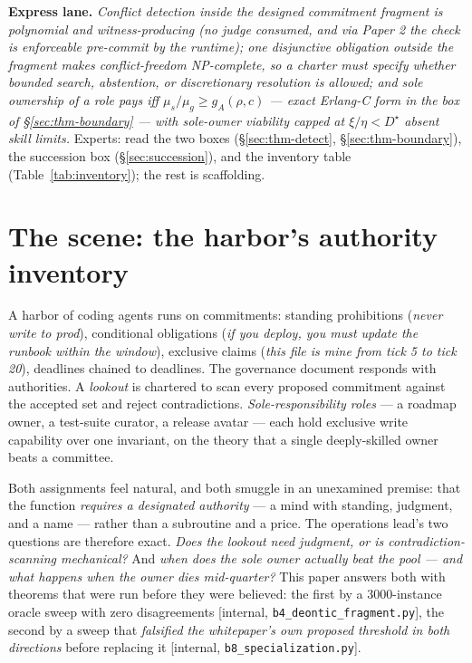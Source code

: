 \documentclass[11pt,a4paper]{article}
\begin{document}
\vspace{0.5em} \noindent\textbf{Express lane.} \emph{Conflict detection inside the designed commitment fragment is polynomial and
witness-producing (no judge consumed, and via Paper 2 the check is enforceable pre-commit by the runtime); one disjunctive
obligation outside the fragment makes conflict-freedom NP-complete, so a charter must specify whether bounded search,
abstention, or discretionary resolution is allowed; and sole
ownership of a role pays iff $\mu_s/\mu_g \ge g_A(\rho,c)$ --- exact Erlang-C form in the box of \S\ref{sec:thm-boundary} --- with
sole-owner viability capped at $\xi/\eta < D^\star$ absent skill limits.} Experts: read the two boxes
(\S\ref{sec:thm-detect}, \S\ref{sec:thm-boundary}), the succession box (\S\ref{sec:succession}), and the inventory table
(Table~\ref{tab:inventory}); the rest is scaffolding.

\section{The scene: the harbor's authority inventory}\label{sec:scene}
A harbor of coding agents runs on commitments: standing prohibitions (\emph{never write to prod}), conditional obligations
(\emph{if you deploy, you must update the runbook within the window}), exclusive claims (\emph{this file is mine from tick 5 to
tick 20}), deadlines chained to deadlines. The governance document responds with authorities. A \emph{lookout} is chartered to
scan every proposed commitment against the accepted set and reject contradictions. \emph{Sole-responsibility roles} --- a roadmap
owner, a test-suite curator, a release avatar --- each hold exclusive write capability over one invariant, on the theory that a
single deeply-skilled owner beats a committee.

Both assignments feel natural, and both smuggle in an unexamined premise: that the function \emph{requires a designated authority}
--- a mind with standing, judgment, and a name --- rather than a subroutine and a price. The operations lead's two questions are
therefore exact. \emph{Does the lookout need judgment, or is contradiction-scanning mechanical?} And \emph{when does the sole
owner actually beat the pool --- and what happens when the owner dies mid-quarter?} This paper answers both with theorems that were
run before they were believed: the first by a 3000-instance oracle sweep with zero disagreements [internal,
\texttt{b4\_deontic\_fragment.py}], the second by a sweep that \emph{falsified the whitepaper's own proposed threshold in both
directions} before replacing it [internal, \texttt{b8\_specialization.py}].
\end{document}
